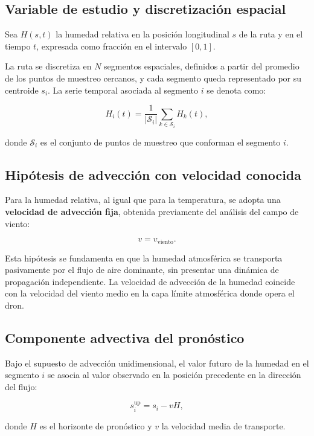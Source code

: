\documentclass[
  spanish,
  us-letterpaper,
]{scrreprt}
\numberwithin{equation}{section}
\begin{document}
\subsection{Variable de estudio y discretización
espacial}\label{variable-de-estudio-y-discretizaciuxf3n-espacial-1}

Sea \(H(s,t)\) la humedad relativa en la posición longitudinal \(s\) de
la ruta y en el tiempo \(t\), expresada como fracción en el intervalo
\([0,1]\).

La ruta se discretiza en \(N\) segmentos espaciales, definidos a partir
del promedio de los puntos de muestreo cercanos, y cada segmento queda
representado por su centroide \(s_i\). La serie temporal asociada al
segmento \(i\) se denota como:

\[
H_i(t) = \frac{1}{|\mathcal{S}_i|} \sum_{k \in \mathcal{S}_i} H_k(t),
\]

donde \(\mathcal{S}_i\) es el conjunto de puntos de muestreo que
conforman el segmento \(i\).

\subsection{Hipótesis de advección con velocidad
conocida}\label{hipuxf3tesis-de-advecciuxf3n-con-velocidad-conocida-1}

Para la humedad relativa, al igual que para la temperatura, se adopta
una \textbf{velocidad de advección fija}, obtenida previamente del
análisis del campo de viento:

\[
v = v_{\text{viento}}.
\]

Esta hipótesis se fundamenta en que la humedad atmosférica se transporta
pasivamente por el flujo de aire dominante, sin presentar una dinámica
de propagación independiente. La velocidad de advección de la humedad
coincide con la velocidad del viento medio en la capa límite atmosférica
donde opera el dron.

\subsection{Componente advectiva del
pronóstico}\label{componente-advectiva-del-pronuxf3stico-1}

Bajo el supuesto de advección unidimensional, el valor futuro de la
humedad en el segmento \(i\) se asocia al valor observado en la posición
precedente en la dirección del flujo:

\[
s_i^{\text{up}} = s_i - vH,
\]

donde \(H\) es el horizonte de pronóstico y \(v\) la velocidad media de
transporte.
\end{document}
